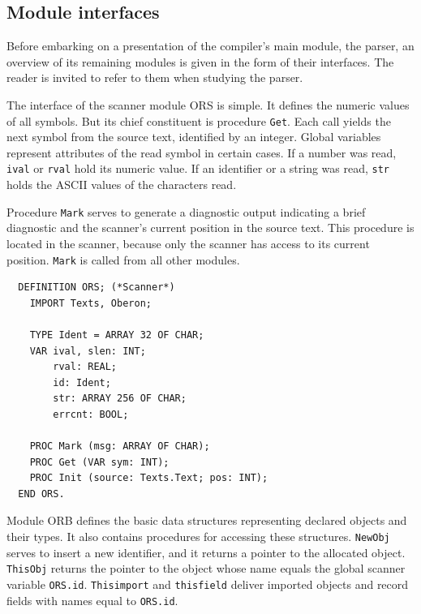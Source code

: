 \subsection{Module interfaces}
\label{ssc:modinf}
Before embarking on a presentation of the compiler's main module, the parser, an overview of its
remaining modules is given in the form of their interfaces. The reader is invited to refer to them
when studying the parser.

The interface of the scanner module ORS is simple. It defines the numeric values of all symbols.
But its chief constituent is procedure \verb|Get|. Each call yields the next symbol from the source
text, identified by an integer. Global variables represent attributes of the read symbol in certain
cases. If a number was read, \verb|ival| or \verb|rval| hold its numeric value. If an identifier or
a string was read, \verb|str| holds the ASCII values of the characters read.

Procedure \verb|Mark| serves to generate a diagnostic output indicating a brief diagnostic and the
scanner's current position in the source text. This procedure is located in the scanner, because only
the scanner has access to its current position. \verb|Mark| is called from all other modules.
\begin{verbatim}
  DEFINITION ORS; (*Scanner*)
    IMPORT Texts, Oberon;
  
    TYPE Ident = ARRAY 32 OF CHAR;
    VAR ival, slen: INT;
        rval: REAL;
        id: Ident;
        str: ARRAY 256 OF CHAR;
        errcnt: BOOL;
  
    PROC Mark (msg: ARRAY OF CHAR);
    PROC Get (VAR sym: INT);
    PROC Init (source: Texts.Text; pos: INT);
  END ORS.
\end{verbatim}

Module ORB defines the basic data structures representing declared objects and their types. It also
contains procedures for accessing these structures. \verb|NewObj| serves to insert a new identifier,
and it returns a pointer to the allocated object. \verb|ThisObj| returns the pointer to the object
whose name equals the global scanner variable \verb|ORS.id|. \verb|Thisimport| and \verb|thisfield|
deliver imported objects and record fields with names equal to \verb|ORS.id|.

